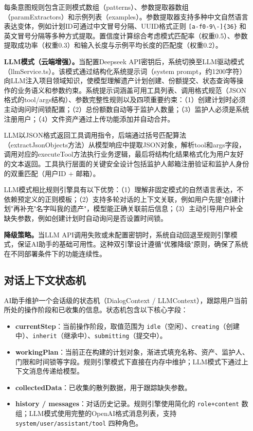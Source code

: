 \documentclass[UTF8,a4paper,zihao=-4,openany]{ctexrep}
\begin{document}
每条意图规则包含正则模式数组（patterns）、参数提取器数组（paramExtractors）和示例列表（examples）。参数提取器支持多种中文自然语言表达变体，例如计划ID可通过中文冒号分隔、UUID格式正则 \texttt{[a-f0-9\textbackslash-]\{36\}} 和英文冒号分隔等多种方式提取。置信度计算综合考虑模式匹配率（权重0.5）、参数提取成功率（权重0.3）和输入长度与示例平均长度的匹配度（权重0.2）。

\noindent\textbf{LLM模式（云端增强）。}当配置Deepseek API密钥后，系统切换至LLM驱动模式（llmService.ts）。该模式通过结构化系统提示词（system prompt，约1200字符）向LLM注入项目领域知识，使模型理解遗产计划创建、份额提交、状态查询等操作的业务语义和参数约束。系统提示词涵盖可用工具列表、调用格式规范（JSON格式的tool/args结构）、参数完整性规则以及四项重要约束：（1）创建计划时必须主动询问时间锁配置；（2）总份额数自动等于监护人数量；（3）监护人必须是系统注册用户；（4）文件资产通过上传功能添加并自动合并。

LLM以JSON格式返回工具调用指令，后端通过括号匹配算法（extractJsonObjects方法）从模型响应中提取JSON对象，解析tool和args字段，调用对应的executeTool方法执行业务逻辑，最后将结构化结果格式化为用户友好的文本返回。工具执行层面的关键安全设计包括监护人邮箱注册验证和监护人身份的双重匹配（用户ID + 邮箱）。

LLM模式相比规则引擎具有以下优势：（1）理解非固定模式的自然语言表达，不依赖预定义的正则模板；（2）支持多轮对话的上下文关联，例如用户先提"创建计划"再补充"名字叫我的遗产"，模型能正确关联前后信息；（3）主动引导用户补全缺失参数，例如创建计划时自动询问是否设置时间锁。

\noindent\textbf{降级策略。}当LLM API调用失败或未配置密钥时，系统自动回退至规则引擎模式，保证AI助手的基础可用性。这种双引擎设计遵循"优雅降级"原则，确保了系统在不同部署条件下的功能连续性。

\subsection{对话上下文状态机}

AI助手维护一个会话级的状态机（DialogContext / LLMContext），跟踪用户当前所处的操作阶段和已收集的信息。状态机包含以下核心字段：

\begin{itemize}
\item \textbf{currentStep}：当前操作阶段，取值范围为 \texttt{idle}（空闲）、\texttt{creating}（创建中）、\texttt{inherit}（继承中）、\texttt{submitting}（提交中）。
\item \textbf{workingPlan}：当前正在构建的计划对象，渐进式填充名称、资产、监护人、门限和时间锁等字段。规则引擎模式下直接在内存中维护；LLM模式下通过上下文消息传递给模型。
\item \textbf{collectedData}：已收集的散列数据，用于跟踪缺失参数。
\item \textbf{history / messages}：对话历史记录。规则引擎使用简化的 \texttt{role+content} 数组；LLM模式使用完整的OpenAI格式消息列表，支持 \texttt{system/user/assistant/tool} 四种角色。
\end{itemize}
\end{document}
